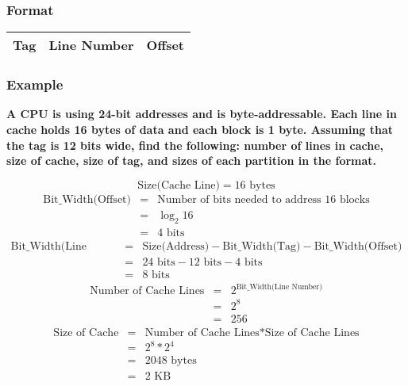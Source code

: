 \documentclass[11pt]{article}
\begin{document}
\subsubsection{Format}

\begin{table}[H]
	\centering
	\begin{tabular}{| c | c | c |}
		\hline
		Tag		&	Line Number		&		 Offset\\
		\hline
	\end{tabular}
\end{table}

\subsubsection{Example}

\textbf{A CPU is using 24-bit addresses and is byte-addressable. Each line in cache holds 16 bytes of data and each block is 1 byte. Assuming that the tag is 12 bits wide, find the following: number of lines in cache, size of cache, size of tag, and sizes of each partition in the format.}

\[
\text{Size(Cache Line)} = 16 \text{ bytes}
\]
\begin{eqnarray*}
	\text{Bit\_Width(Offset)} &=& \text{Number of bits needed to address 16 blocks}\\
		&=& \log_2 16\\
		&=& 4 \text{ bits}
\end{eqnarray*}
\begin{eqnarray*}
\text{Bit\_Width(Line Number)} &=& \text{Size(Address)} - \text{Bit\_Width(Tag)} - \text{Bit\_Width(Offset)}\\
	&=& 24 \text{ bits} - 12 \text{ bits} - 4 \text{ bits}\\
	&=& 8 \text{ bits}
\end{eqnarray*}
\begin{eqnarray*}
	\text{Number of Cache Lines} &=& 2^\text{Bit\_Width(Line Number)}\\
		&=& 2^8\\
		&=& 256
\end{eqnarray*}
\begin{eqnarray*}
	\text{Size of Cache} &=& \text{Number of Cache Lines} * \text{Size of Cache Lines}\\
		&=& 2^8 * 2^4\\
		&=& 2048 \text{ bytes}\\
		&=& 2 \text{ KB}
\end{eqnarray*}
\end{document}
